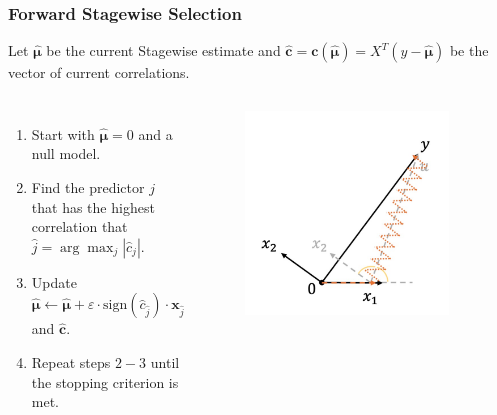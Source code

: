 \begin{frame}
\frametitle{Forward Stagewise Selection}
Let $\hat{\mathbf{\mu}}$ be the current Stagewise estimate and $\hat{\mathbf{c}}=\mathbf{c}(\hat{\mathbf{\mu}})=X^T(y-\hat{\mathbf{\mu}})$ be the vector of current correlations.

\begin{columns}[t]
    \begin{enumerate}
        \item Start with $\hat{\mathbf{\mu}}=0$ and a null model.
        \item Find the predictor $j$ that has the highest correlation that $\hat{j}=\arg\max_{j}|\hat{c}_j|$.
        \item Update $\hat{\mathbf{\mu}}\leftarrow\hat{\mathbf{\mu}}+\varepsilon\cdot\text{sign}(\hat{c}_{\hat{j}})\cdot\mathbf{x}_{\hat{j}}$ and $\mathbf{\hat{c}}$.
        \item Repeat steps $2-3$ until the stopping criterion is met.
    \end{enumerate}
    
    \begin{figure}[!htbp]
        \begin{center}
            \includegraphics[width=0.9\textwidth]{img/FStageR/2.jpeg}
        \end{center}
    \end{figure}
\end{columns}
\end{frame}

